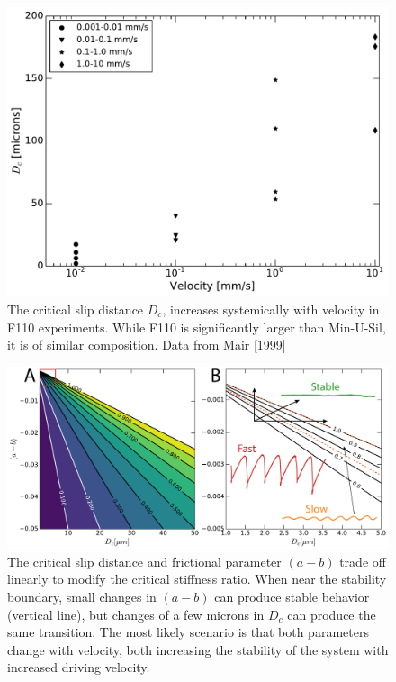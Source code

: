 \begin{figure}[H]
	\centering
		\includegraphics[scale=0.6]{chap_slow_slip_details/Figure_14.pdf}
   	\caption{The critical slip distance $D_c$, increases systemically with velocity in F110 experiments. While F110 is significantly larger than Min-U-Sil, it is of similar composition. Data from \cite{}Mair [1999]}
  	\label{Figure_14}
\end{figure}

\clearpage

\begin{figure}[H]
	\centering
		\includegraphics[scale=0.45]{chap_slow_slip_details/Figure_15.pdf}
   	\caption{The critical slip distance and frictional parameter $(a-b)$ trade off linearly to modify the critical stiffness ratio. When near the stability boundary, small changes in $(a-b)$ can produce stable behavior (vertical line), but changes of a few microns in $D_c$ can produce the same transition. The most likely scenario is that both parameters change with velocity, both increasing the stability of the system with increased driving velocity.}
  	\label{Figure_15}
\end{figure}

